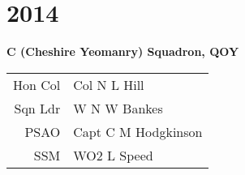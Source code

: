 \chapter*{2014}

\begin{center}
  \Large
  \textbf{C (Cheshire Yeomanry) Squadron, QOY}
\end{center}

\begin{center}
  \begin{tabular}{rl}
    Hon Col & Col N L Hill \\
    Sqn Ldr & W N W Bankes \\
    PSAO & Capt C M Hodgkinson \\
    SSM & WO2 L Speed \\
  \end{tabular}
\end{center}
